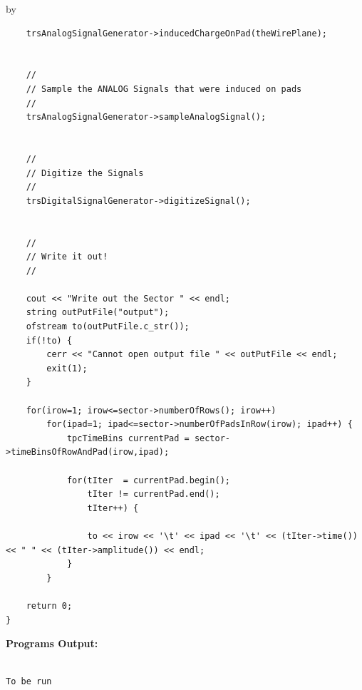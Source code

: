\documentclass[twoside]{article}
\newcommand{\entrylabel}[1]{\mbox{\textbf{{#1}}}\hfil}%
\newenvironment{entry}
{\begin{list}{}%
    {\renewcommand{\makelabel}{\entrylabel}%
     \setlength{\labelwidth}{90pt}%
     \setlength{\leftmargin}{\labelwidth}
     \advance\leftmargin by \labelsep%
      }%
    }%
  {\end{list}}
\newcommand{\Entrylabel}[1]%
{\raisebox{0pt}[1ex][0pt]{\makebox[\labelwidth][l]%
    {\parbox[t]{\labelwidth}{\hspace{0pt}\textbf{{#1}}}}}}
\newenvironment{Entry}%
{\renewcommand{\entrylabel}{\Entrylabel}\begin{entry}}%
  {\end{entry}}
\begin{document}
\begin{Entry}
{\begin{verbatim}
    trsAnalogSignalGenerator->inducedChargeOnPad(theWirePlane);


    //
    // Sample the ANALOG Signals that were induced on pads
    //
    trsAnalogSignalGenerator->sampleAnalogSignal();
    
    
    //
    // Digitize the Signals
    //
    trsDigitalSignalGenerator->digitizeSignal();

    
    //
    // Write it out!
    //
    
    cout << "Write out the Sector " << endl;
    string outPutFile("output");
    ofstream to(outPutFile.c_str());
    if(!to) {
        cerr << "Cannot open output file " << outPutFile << endl;
        exit(1);
    }
    
    for(irow=1; irow<=sector->numberOfRows(); irow++)
        for(ipad=1; ipad<=sector->numberOfPadsInRow(irow); ipad++) {
            tpcTimeBins currentPad = sector->timeBinsOfRowAndPad(irow,ipad);

            for(tIter  = currentPad.begin();
                tIter != currentPad.end();
                tIter++) {

                to << irow << '\t' << ipad << '\t' << (tIter->time()) << " " << (tIter->amplitude()) << endl;
            }
        }

    return 0;
}

\end{verbatim}
}%
{\bf Programs Output:}
{\footnotesize
\begin{verbatim}

To be run

\end{verbatim}
} %

\end{Entry}
\clearpage













  


%
%

\printindex
\end{document}
